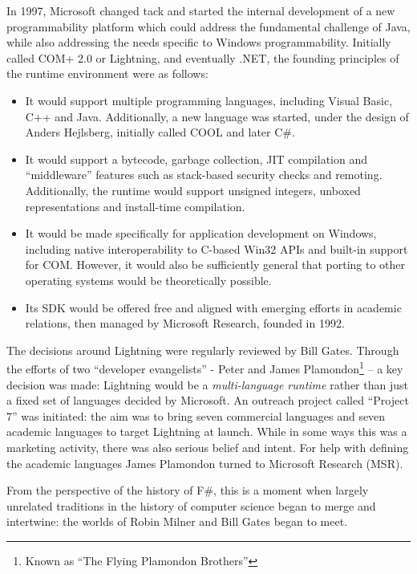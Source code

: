 \documentclass[acmsmall]{acmart}\settopmatter{}
\begin{document}
In 1997, Microsoft changed tack and started the internal development of a new programmability platform which could
address the fundamental challenge of Java, while also addressing the needs specific to Windows programmability.  Initially
called COM+ 2.0 or Lightning, and eventually .NET, the founding principles of the runtime environment were as follows:
\begin{itemize}
\item It would support multiple programming languages, including Visual Basic, C++ and Java. Additionally, a new language was started, under the design of Anders Hejlsberg, initially called COOL and later C\#.
\item It would support a bytecode, garbage collection, JIT compilation and “middleware” features such as stack-based security checks and remoting. Additionally, the runtime would support unsigned integers, unboxed representations and install-time compilation.
\item It would be made specifically for application development on Windows, including native interoperability to C-based Win32 APIs and built-in support for COM. However, it would also be sufficiently general that porting to other operating systems would be theoretically possible.
\item Its SDK would be offered free and aligned with emerging efforts in academic relations, then managed by Microsoft Research, founded in 1992.
\end{itemize}

The decisions around Lightning were regularly reviewed by Bill Gates. Through the efforts of two “developer evangelists” - Peter
and James Plamondon\footnote{ Known as “The Flying Plamondon Brothers”}  – a key decision was made: Lightning would
be a \emph{multi-language runtime} rather than just a fixed set of languages decided by Microsoft.  An outreach
project called “Project 7” was initiated: the aim was to bring seven commercial languages and seven academic languages to
target Lightning at launch. While in some ways this was a marketing activity, there was also serious belief and intent.  For
help with defining the academic languages James Plamondon turned to Microsoft Research (MSR).

From the perspective of the history of F\#, this is a moment when largely unrelated traditions in the history of computer science began to merge and intertwine: the worlds of Robin Milner and Bill Gates began to meet.
\end{document}

